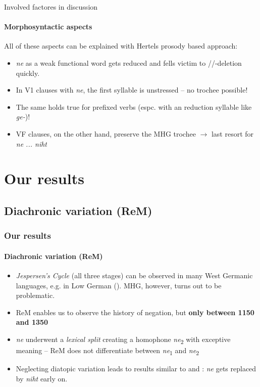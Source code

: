 \documentclass[xcolor=table, compress, %
handout
]{beamer}
\begin{document}
\begin{frame}{Involved factores in discussion}
\framesubtitle{Morphosyntactic aspects}

All of these aspects can be explained with Hertels \citeyear{HertelimErscheinen} prosody based approach:

\begin{itemize}
    \item \textit{ne} as a weak functional word gets reduced and fells victim to //-deletion quickly.
    \item In V1 clauses with \textit{ne}, the first syllable is unstressed – no trochee possible!
    \item The same holds true for prefixed verbs (espc. with an reduction syllable like \textit{ge-})!
    \item VF clauses, on the other hand, preserve the MHG trochee $\rightarrow$ last resort for \textit{ne ... niht}
\end{itemize}

\end{frame}

\section{Our results}

\subsection{Diachronic variation (ReM)}
\begin{frame}
\frametitle{Our results}
\framesubtitle{Diachronic variation (ReM)}
    
    \begin{itemize}
        \item \textit{Jespersen's Cycle} (all three stages) can be observed in many West Germanic languages, e.g. in Low German (\citealt{Breitbarth2014}). MHG, however, turns out to be problematic.
        \item ReM enables us to observe the history of negation, but \textbf{only between 1150 and 1350}
        \item \textit{ne} underwent a \textit{lexical split} creating a homophone \textit{ne}\textsubscript{2} with exceptive meaning – ReM does not differentiate between \textit{ne}\textsubscript{1} and \textit{ne}\textsubscript{2}
        \item Neglecting diatopic variation leads to results similar to \citet{jaeger08} and \citet{Pickl2017}: \textit{ne} gets replaced by \textit{niht} early on.
    \end{itemize}
    
\end{frame}
\end{document}
